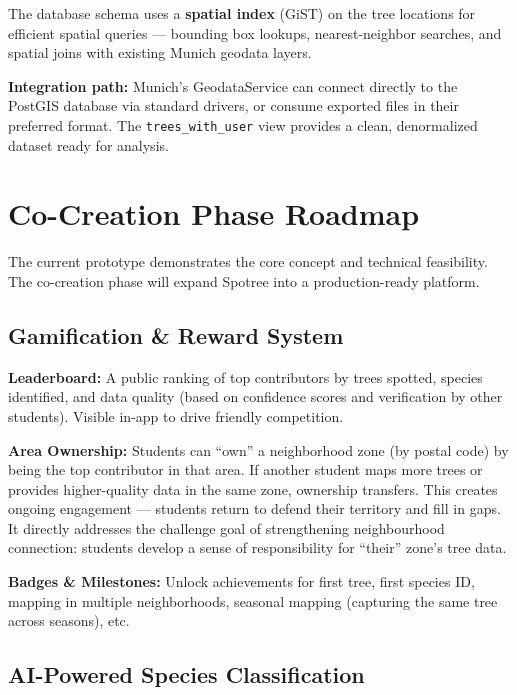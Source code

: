\documentclass[11pt,a4paper]{article}
\begin{document}
The database schema uses a \textbf{spatial index} (GiST) on the tree locations for efficient spatial queries --- bounding box lookups, nearest-neighbor searches, and spatial joins with existing Munich geodata layers.

\textbf{Integration path:} Munich's GeodataService can connect directly to the PostGIS database via standard drivers, or consume exported files in their preferred format. The \texttt{trees\_with\_user} view provides a clean, denormalized dataset ready for analysis.

\clearpage
\section{Co-Creation Phase Roadmap}

The current prototype demonstrates the core concept and technical feasibility. The co-creation phase will expand Spotree into a production-ready platform.

\subsection{Gamification \& Reward System}

\textbf{Leaderboard:} A public ranking of top contributors by trees spotted, species identified, and data quality (based on confidence scores and verification by other students). Visible in-app to drive friendly competition.

\textbf{Area Ownership:} Students can ``own'' a neighborhood zone (by postal code) by being the top contributor in that area. If another student maps more trees or provides higher-quality data in the same zone, ownership transfers. This creates ongoing engagement --- students return to defend their territory and fill in gaps. It directly addresses the challenge goal of strengthening neighbourhood connection: students develop a sense of responsibility for ``their'' zone's tree data.

\textbf{Badges \& Milestones:} Unlock achievements for first tree, first species ID, mapping in multiple neighborhoods, seasonal mapping (capturing the same tree across seasons), etc.

\subsection{AI-Powered Species Classification}
\label{sec:ai-species}
\end{document}
